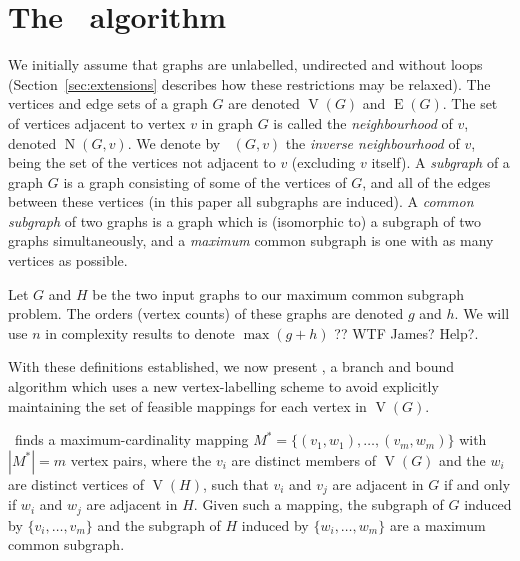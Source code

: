 \documentclass[letterpaper]{article}
\newcommand{\McSplit}{\textproc{McSplit}}
\DeclareMathOperator{\V}{V}
\DeclareMathOperator{\E}{E}
\DeclareMathOperator{\N}{N}
\DeclareMathOperator{\invN}{\overline{N}}
\begin{document}
\section{The \McSplit\ algorithm}

We initially assume that graphs are unlabelled, undirected and without loops
(Section~\ref{sec:extensions} describes how these restrictions may be relaxed).
The vertices and edge sets of a graph $G$ are denoted $\V(G)$ and $\E(G)$.  The
set of vertices adjacent to vertex $v$ in graph $G$ is called the
\emph{neighbourhood} of $v$, denoted $\N(G, v)$. We denote by $\invN(G, v)$ the
\emph{inverse neighbourhood} of $v$, being the set of the vertices not adjacent
to $v$ (excluding $v$ itself). A \emph{subgraph} of a graph $G$ is a graph
consisting of some of the vertices of $G$, and all of the edges between these
vertices (in this paper all subgraphs are induced). A \emph{common subgraph} of
two graphs is a graph which is (isomorphic to) a subgraph of two graphs
simultaneously, and a \emph{maximum} common subgraph is one with as many
vertices as possible.

Let $G$ and $H$ be the two input graphs to our maximum common subgraph problem.
The orders (vertex counts) of these graphs are denoted $g$ and $h$. We will
use $n$ in complexity results to denote $\max(g + h)$ ?? WTF James? Help?.

With these definitions established, we now present \McSplit, a branch and bound
algorithm which uses a new vertex-labelling scheme to avoid explicitly
maintaining the set of feasible mappings for each vertex in $\V(G)$.

\McSplit\ finds a maximum-cardinality mapping $M^* = \{(v_1, w_1), \dots,
(v_{m}, w_{m})\}$ with $|M^*| = m$ vertex pairs, where the $v_i$ are distinct members of $\V(G)$ and the
$w_i$ are distinct vertices of $\V(H)$, such that $v_i$ and $v_j$ are adjacent
in $G$ if and only if $w_i$ and $w_j$ are adjacent in $H$. 
Given such a mapping, the subgraph of $G$ induced by $\{v_i, \dots, v_{m}\}$
and the subgraph of $H$ induced by $\{w_i, \dots, w_{m}\}$ are a maximum
common subgraph.
\end{document}
